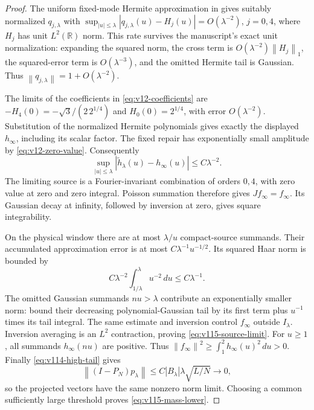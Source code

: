 \documentclass[11pt]{article}
\theoremstyle{remark}
\newcommand{\norm}[1]{\left\lVert #1\right\rVert}
\begin{document}
\begin{proof}
The uniform fixed-mode Hermite approximation in
\cite[Lemma~7.2]{ConnesConsaniMoscovici2025} gives suitably normalized
$q_{j,\lambda}$ with
$\sup_{|u|\le\lambda}|q_{j,\lambda}(u)-H_j(u)|=O(\lambda^{-2})$,
$j=0,4$, where $H_j$ has unit $L^2(\mathbb R)$ norm. This rate survives
the manuscript's exact unit normalization: expanding the squared norm,
the cross term is $O(\lambda^{-2})\norm{H_j}_1$, the squared-error term
is $O(\lambda^{-3})$, and the omitted Hermite tail is Gaussian.
Thus $\norm{q_{j,\lambda}}=1+O(\lambda^{-2})$.

The limits of the coefficients in \eqref{eq:v12-coefficients} are
$-H_4(0)=-\sqrt3/(2\,2^{1/4})$ and $H_0(0)=2^{1/4}$, with error
$O(\lambda^{-2})$. Substitution of the normalized Hermite polynomials
gives exactly the displayed $h_\infty$, including its scalar factor.
The fixed repair has exponentially small amplitude by
\eqref{eq:v12-zero-value}. Consequently
\[
 \sup_{|u|\le\lambda}|\widetilde h_\lambda(u)-h_\infty(u)|
       \le C\lambda^{-2}.
\]
The limiting source is a Fourier-invariant combination of orders $0,4$,
with zero value at zero and zero integral. Poisson summation therefore
gives $Jf_\infty=f_\infty$. Its Gaussian decay at infinity, followed by
inversion at zero, gives square integrability.

On the physical window there are at most $\lambda/u$ compact-source
summands. Their accumulated approximation error is at most
$C\lambda^{-1}u^{-1/2}$. Its squared Haar norm is bounded by
\[
 C\lambda^{-2}\int_{1/\lambda}^\lambda u^{-2}\,du
       \le C\lambda^{-1}.
\]
The omitted Gaussian summands $nu>\lambda$ contribute an exponentially
smaller norm: bound their decreasing polynomial-Gaussian tail by its
first term plus $u^{-1}$ times its tail integral. The same estimate and
inversion control $f_\infty$ outside $I_\lambda$. Inversion averaging
is an $L^2$ contraction, proving \eqref{eq:v115-source-limit}.
For $u\ge1$, all summands $h_\infty(nu)$ are positive. Thus
$\norm{f_\infty}^2\ge\int_1^2h_\infty(u)^2\,du>0$.
Finally \eqref{eq:v114-high-tail} gives
\[
 \norm{(I-P_N)p_\lambda}
       \le C|B_\lambda|\lambda\sqrt{L/N}\longrightarrow0,
\]
so the projected vectors have the same nonzero norm limit. Choosing a
common sufficiently large threshold proves \eqref{eq:v115-mass-lower}.
\end{proof}
\end{document}
